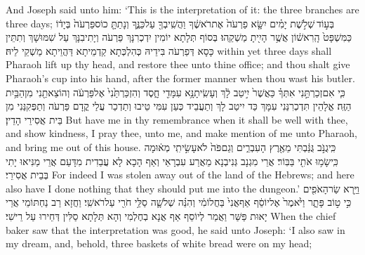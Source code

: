 {And Joseph said unto him: ‘This is the interpretation of it: the three branches are three days;}{}
{בְּע֣וֹד \legarmeh  שְׁלֹ֣שֶׁת יָמִ֗ים יִשָּׂ֤א פַרְעֹה֙ אֶת\maqqaf רֹאשֶׁ֔ךָ וַהֲשִֽׁיבְךָ֖ עַל\maqqaf כַּנֶּ֑ךָ וְנָתַתָּ֤ כוֹס\maqqaf פַּרְעֹה֙ בְּיָד֔וֹ כַּמִּשְׁפָּט֙ הָֽרִאשׁ֔וֹן אֲשֶׁ֥ר הָיִ֖יתָ מַשְׁקֵֽהוּ׃}
{בְּסוֹף תְּלָתָא יוֹמִין יִדְכְרִנָּךְ פַּרְעֹה וְיָתִיבִנָּךְ עַל שִׁמּוּשָׁךְ וְתִתֵּין כָּסָא דְּפַרְעֹה בִּידֵיהּ כְּהִלְכְּתָא קַדְמֵיתָא דַּהֲוֵיתָא מַשְׁקֵי לֵיהּ׃}
{within yet three days shall Pharaoh lift up thy head, and restore thee unto thine office; and thou shalt give Pharaoh’s cup into his hand, after the former manner when thou wast his butler.}{}
{כִּ֧י אִם\maqqaf זְכַרְתַּ֣נִי אִתְּךָ֗ כַּאֲשֶׁר֙ יִ֣יטַב לָ֔ךְ וְעָשִֽׂיתָ\maqqaf נָּ֥א עִמָּדִ֖י חָ֑סֶד וְהִזְכַּרְתַּ֙נִי֙ אֶל\maqqaf פַּרְעֹ֔ה וְהוֹצֵאתַ֖נִי מִן\maqqaf הַבַּ֥יִת הַזֶּֽה׃}
{אֱלָהֵין תִּדְכְרִנַּנִי עִמָּךְ כַּד יִיטַב לָךְ וְתַעֲבֵיד כְּעַן עִמִּי טֵיבוּ וְתַדְכַר עֲלַי קֳדָם פַּרְעֹה וְתַפְּקִנַּנִי מִן בֵּית אֲסִירֵי הָדֵין׃}
{But have me in thy remembrance when it shall be well with thee, and show kindness, I pray thee, unto me, and make mention of me unto Pharaoh, and bring me out of this house.}{}
{כִּֽי\maqqaf גֻנֹּ֣ב גֻּנַּ֔בְתִּי מֵאֶ֖רֶץ הָעִבְרִ֑ים וְגַם\maqqaf פֹּה֙ לֹא\maqqaf עָשִׂ֣יתִֽי מְא֔וּמָה כִּֽי\maqqaf שָׂמ֥וּ אֹתִ֖י בַּבּֽוֹר׃}
{אֲרֵי מִגְנָב גְּנִיבְנָא מֵאֲרַע עִבְרָאֵי וְאַף הָכָא לָא עֲבַדִית מִדָּעַם אֲרֵי מַנִּיאוּ יָתִי בְּבֵית אֲסִירֵי׃}
{For indeed I was stolen away out of the land of the Hebrews; and here also have I done nothing that they should put me into the dungeon.’}{}
{וַיַּ֥רְא שַׂר\maqqaf הָאֹפִ֖ים כִּ֣י ט֣וֹב פָּתָ֑ר וַיֹּ֙אמֶר֙ אֶל\maqqaf יוֹסֵ֔ף אַף\maqqaf אֲנִי֙ בַּחֲלוֹמִ֔י וְהִנֵּ֗ה שְׁלֹשָׁ֛ה סַלֵּ֥י חֹרִ֖י עַל\maqqaf רֹאשִֽׁי׃}
{וַחֲזָא רַב נַחְתּוֹמֵי אֲרֵי יָאוּת פַּשַּׁר וַאֲמַר לְיוֹסֵף אַף אֲנָא בְחֶלְמִי וְהָא תְּלָתָא סַלִּין דְּחֵירוּ עַל רֵישִׁי׃}
{When the chief baker saw that the interpretation was good, he said unto Joseph: ‘I also saw in my dream, and, behold, three baskets of white bread were on my head;}{}
